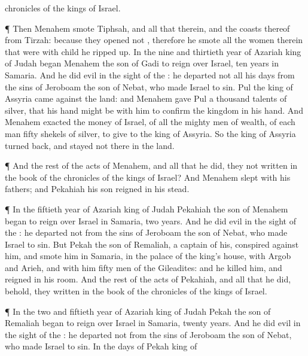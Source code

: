 {chronicles of the
kings of
Israel.
\par }{\PP {}¶ Then
Menahem
smote
Tiphsah, and all that
{} therein, and the
coasts thereof from
Tirzah: because they
opened not
{}, therefore he
smote
{} all the women therein that were with
child he ripped
up.
In the
nine and
thirtieth
year of
Azariah
king of
Judah began
Menahem the
son of
Gadi to
reign over
Israel,
{}
ten
years in
Samaria.
And he
did
{}
evil in the
sight of the
{}: he
departed not all his
days from the
sins of
Jeroboam the
son of
Nebat, who made
Israel to
sin.
Pul the
king of
Assyria
came against the
land: and
Menahem
gave
Pul a
thousand
talents of
silver, that his
hand might be with him to
confirm the
kingdom in his
hand.
And
Menahem
exacted the
money of
Israel,
{} of all the mighty
men of
wealth, of
each
man
fifty
shekels of
silver, to
give to the
king of
Assyria. So the
king of
Assyria turned
back, and
stayed not there in the
land.
\par }{\PP {}¶ And the
rest of the
acts of
Menahem, and all that he
did,
{} they not
written in the
book of the
chronicles of the
kings of
Israel?
And
Menahem
slept with his
fathers; and
Pekahiah his
son
reigned in his stead.
\par }{\PP {}¶ In the
fiftieth
year of
Azariah
king of
Judah
Pekahiah the
son of
Menahem began to
reign over
Israel in
Samaria,
{} two
years.
And he
did
{}
evil in the
sight of the
{}: he
departed not from the
sins of
Jeroboam the
son of
Nebat, who made
Israel to
sin.
But
Pekah the
son of
Remaliah, a
captain of his,
conspired against him, and
smote him in
Samaria, in the
palace of the
king’s
house, with
Argob and
Arieh, and with him
fifty
men of the
Gileadites: and he
killed him, and
reigned in his room.
And the
rest of the
acts of
Pekahiah, and all that he
did, behold, they
{}
written in the
book of the
chronicles of the
kings of
Israel.
\par }{\PP {}¶ In the
two and
fiftieth
year of
Azariah
king of
Judah
Pekah the
son of
Remaliah began to
reign over
Israel in
Samaria,
{}
twenty
years.
And he
did
{}
evil in the
sight of the
{}: he
departed not from the
sins of
Jeroboam the
son of
Nebat, who made
Israel to
sin.
In the
days of
Pekah
king of
}
